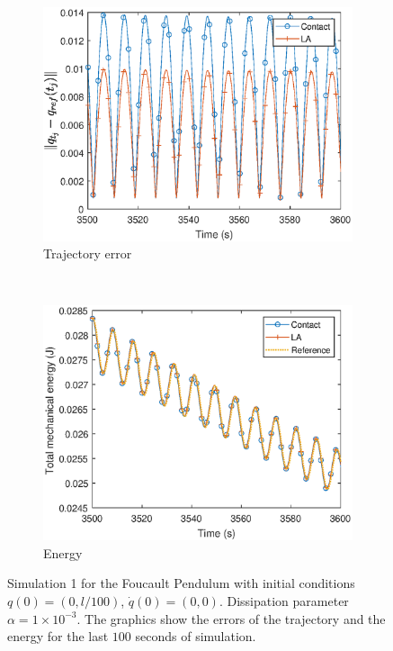 \documentclass{aims}
\numberwithin{equation}{section}
\theoremstyle{definition}
\begin{document}
\begin{figure}
  \centering
  \begin{subfigure}[b]{0.65\textwidth}
    \centering
    \includegraphics[width=\textwidth]{fig/err-alpha0001.eps}
    \caption{Trajectory error}
  \end{subfigure} \\
  \begin{subfigure}[b]{0.65\textwidth}
    \centering
    \includegraphics[width=\textwidth]{fig/energia-alpha0001.eps}
    \caption{Energy}
  \end{subfigure}
  \caption{Simulation 1 for the Foucault Pendulum with initial conditions $q(0) = (0,l/100)$, $\dot{q}(0) = (0,0)$. Dissipation parameter $\alpha = 1\times 10^{-3}$.  The graphics show the errors of the trajectory and the energy for the last $100$ seconds of simulation.}
  \label{fig:foucault_sim_1_err_energy}
\end{figure}
\end{document}
